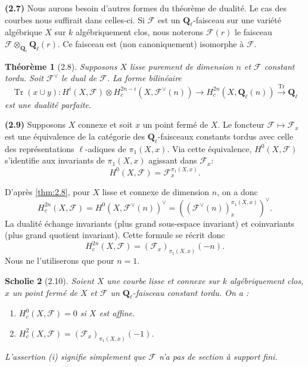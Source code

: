 \documentclass[12pt,a4paper]{amsart}
\theoremstyle{plain}
\newtheorem{theoreme}{Th\'eor\`eme}[section]
\newtheorem{scholie}[theoreme]{Scholie}
\theoremstyle{definition}
\theoremstyle{remark}
\DeclareMathOperator{\Tr}{Tr}
\newcommand{\Q}{\mathbf{Q}}
\numberwithin{equation}{section}
\begin{document}
\noindent \textbf{(2.7)} Nous aurons besoin d'autres formes du th\'eor\`eme de dualit\'e. Le cas des courbes nous suffirait dans celles-ci. Si $\mathscr{F}$ est un $\Q_\ell$-faisceau sur une vari\'et\'e alg\'ebrique $X$ sur $k$ alg\'ebriquement clos, nous noterons $\mathscr{F}(r)$ le faisceau $\mathscr{F}\otimes_{\Q_\ell}\Q_\ell(r)$. Ce faisceau est (non canoniquement) isomorphe \`a $\mathscr{F}$.

\begin{theoreme}[2.8]\label{thm:2.8}
Supposons $X$ lisse purement de dimension $n$ et $\mathscr{F}$ constant tordu. Soit $\mathscr{F}^\vee$ le dual de $\mathscr{F}$. La forme bilin\'eaire
\[
\Tr(x\cup y) : H^i(X,\mathscr{F}) \otimes H^{2n-i}_c(X,\mathscr{F}^\vee(n)) \longrightarrow H^{2n}_c(X,\Q_\ell(n)) \xrightarrow{\Tr} \Q_\ell
\]
est une dualit\'e parfaite.
\end{theoreme}

\noindent \textbf{(2.9)} Supposons $X$ connexe et soit $x$ un point ferm\'e de $X$. Le foncteur $\mathscr{F}\mapsto\mathscr{F}_x$ est une \'equivalence de la cat\'egorie des $\Q_\ell$-faisceaux constants tordus avec celle des repr\'esentations $\ell$-adiques de $\pi_1(X,x)$. Via cette \'equivalence, $H^0(X,\mathscr{F})$ s'identifie aux invariants de $\pi_1(X,x)$ agissant dans $\mathscr{F}_x$:
\begin{equation}\label{eq:2.9.1}
H^0(X,\mathscr{F}) = \mathscr{F}_x^{\pi_1(X,x)}.
\end{equation}

D'apr\`es \eqref{thm:2.8}, pour $X$ lisse et connexe de dimension $n$, on a donc
\[
H^{2n}_c(X,\mathscr{F}) = H^0(X,\mathscr{F}^\vee(n))^\vee = ((\mathscr{F}^\vee(n))_x^{\pi_1(X,x)})^\vee.
\]
La dualit\'e \'echange invariants (plus grand sous-espace invariant) et coinvariants (plus grand quotient invariant). Cette formule se r\'ecrit donc
\[
H^{2n}_c(X,\mathscr{F}) = (\mathscr{F}_x)_{\pi_1(X,x)}(-n).
\]
Nous ne l'utiliserons que pour $n=1$.

\begin{scholie}[2.10]\label{sch:2.10}
Soient $X$ une courbe lisse et connexe sur $k$ alg\'ebriquement clos, $x$ un point ferm\'e de $X$ et $\mathscr{F}$ un $\Q_\ell$-faisceau constant tordu. On a :
\begin{enumerate}
\item[(i)] $H^0_c(X,\mathscr{F})=0$ si $X$ est affine.
\item[(ii)] $H^2_c(X,\mathscr{F})=(\mathscr{F}_x)_{\pi_1(X,x)}(-1)$.
\end{enumerate}
L'assertion (i) signifie simplement que $\mathscr{F}$ n'a pas de section \`a support fini.
\end{scholie}
\end{document}
